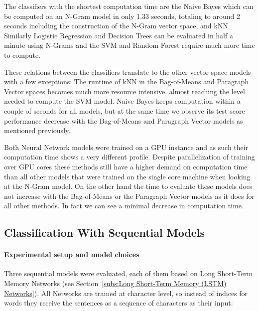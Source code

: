 The classifiers with the shortest computation time are the Naive Bayes which can be computed on an N-Gram model in only 1.33 seconds, totaling to around 2 seconds including the construction of the N-Gram vector space, and kNN. Similarly Logistic Regression and Decision Trees can be evaluated in half a minute using N-Grams and the SVM and Random Forest require much more time to compute.

These relations between the classifiers translate to the other vector space models with a few exceptions: The runtime of kNN in the Bag-of-Means and Paragraph Vector spaces becomes much more resource intensive, almost reaching the level needed to compute the SVM model. Naive Bayes keeps computation within a couple of seconds for all models, but at the same time we observe its test score performance decrease with the Bag-of-Means and Paragraph Vector models as mentioned previously.

Both Neural Network models were trained on a GPU instance and as such their computation time shows a very different profile. Despite parallelization of training over GPU cores these methods still have a higher demand on computation time than all other models that were trained on the single core machine when looking at the N-Gram model. On the other hand the time to evaluate these models does not increase with the Bag-of-Means or the Paragraph Vector models as it does for all other methods. In fact we can see a minimal decrease in computation time.


\subsection{Classification With Sequential Models}
\label{sub:Classification With Sequential Models}


\paragraph{Experimental setup and model choices}
\label{par:Experimental setup and model choices}

Three sequential models were evaluated, each of them based on Long Short-Term Memory Networks (see Section~\ref{subs:Long Short-Term Memory (LSTM) Networks}). All Networks are trained at character level, so instead of indices for words they receive the sentences as a sequence of characters as their input:


